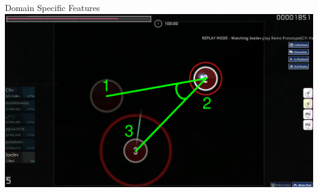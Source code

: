 \documentclass[table]{beamer}
\begin{document}
\begin{frame}{Domain Specific Features}
  \includegraphics[width=1.00\textwidth]{images/angle.png}
\end{frame}
\end{document}
